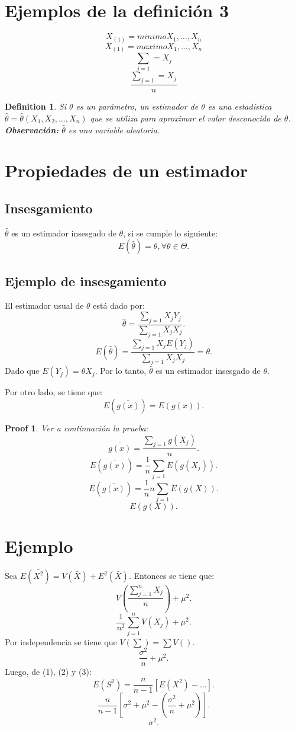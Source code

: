 \documentclass{article}
\newtheorem{mydef}{Definition}
\newtheorem{myprf}{Proof}
\begin{document}
\section{Ejemplos de la definición 3}
$$X_{(1)}=minimo{X_{1}, \ldots, X_{n}}$$
$$X_{(1)}=maximo{X_{1}, \ldots, X_{n}}$$
$$\sum_{j=1}=X_{j}$$
$$\frac{\sum_{j=1}=X_{j}}{n}$$ 

\begin{mydef}
Si $\theta$ es un parámetro, un estimador de $\theta$ es una estadística $\hat{\theta}=\hat{\theta}(X_{1},X_{2},\ldots,X_{n})$ que se utiliza para aproximar el valor desconocido de $\theta$. \textbf{Observación:} $\hat{\theta}$ es una variable aleatoria.
\end{mydef}

\section{Propiedades de un estimador}
\subsection{Insesgamiento}
$\hat{\theta}$ es un estimador insesgado de $\theta$, si se cumple lo siguiente:
\[ E(\hat{\theta})=\theta, \forall \theta \in \Theta.\]
\subsection{Ejemplo de insesgamiento}
El estimador usual de $\theta$ está dado por:
\[  \hat{\theta} = \frac{\sum_{j=1}X_{j}Y_{j}}{\sum_{j=1}X_{j}X_{j}}.\]
\[  E(\hat{\theta})=  \frac{\sum_{j=1}X_{j}E(Y_{j})}{\sum_{j=1}X_{j}X_{j}} = \theta.\]
Dado que $E(Y_{j}) = \theta X_{j}$. Por lo tanto, $\hat{\theta}$ es un estimador insesgado de $\theta$.

Por otro lado, se tiene que:
\[ E(\bar{g(x)})=E(g(x)).\]
\begin{myprf}
Ver a continuación la prueba:
\[ \bar{g(x)}= \frac{\sum_{j=1}g(X_{j})}{n}.\]
\[ E(\bar{g(x)})=  \frac{1}{n} \sum_{j=1} E(g(X_{j})).\]
\[ E(\bar{g(x)})=  \frac{1}{n} n \sum_{j=1} E(g(X)).\]
\[ E(g(X)).\]

\end{myprf}

\section{Ejemplo}
Sea $E(\bar{X^{2}}) = V(\bar{X}) + E^{2}(\bar{X})$. Entonces se tiene que:
\[ V(\frac{\sum_{j=1}^{n}X_{j}}{n}) + \mu^{2}.\]
\[ \frac{1}{n^{2}} \sum_{j=1}^{n}V(X_{j}) + \mu^{2}.\] Por independencia se tiene que $V(\sum) = \sum V()$.
\[  \frac{\sigma^{2}}{n} + \mu^{2}.\]
Luego, de (1), (2) y (3):
\[ E(S^{2})=  \frac{n}{n-1}[E(X^{2})- \ldots ].\]
\[  \frac{n}{n-1}[\sigma^{2}+\mu^{2}-( \frac{\sigma^{2}}{n} + \mu^{2})].\]
\[ \sigma^{2}.\]
\end{document}
